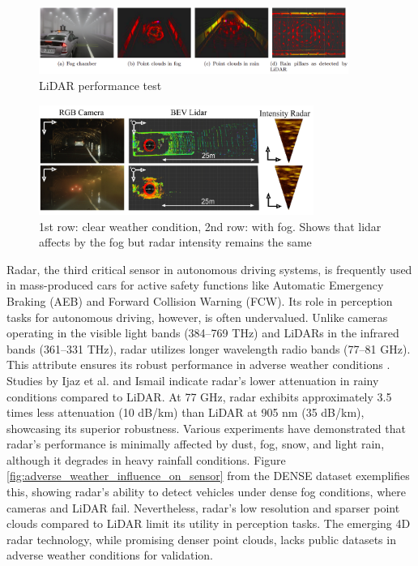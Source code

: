 \documentclass[report.tex]{subfiles}
\begin{document}
    \begin{figure}[h]
        \centering
        \includegraphics[width=0.9\textwidth]{images/lidar_issues.png}
        \caption{LiDAR performance test \cite{Zhang2021Dec}}
        \label{fig:lidar}
    \end{figure}

    \begin{figure}[h]
        \centering
        \includegraphics[width=0.8\textwidth]{images/lidar_in_fog.png}
        \caption{\centering 1st row: clear weather condition, 2nd row: with fog. Shows that lidar affects by the fog but radar intensity remains the same \cite{bijelic2020seeing}}
        \label{fig:lidar_in_fog}
    \end{figure}
    
    Radar, the third critical sensor in autonomous driving systems, is frequently used in mass-produced cars for active safety functions like Automatic Emergency Braking (AEB) and Forward Collision Warning (FCW). Its role in perception tasks for autonomous driving, however, is often undervalued. Unlike cameras operating in the visible light bands (384–769 THz) and LiDARs in the infrared bands (361–331 THz), radar utilizes longer wavelength radio bands (77–81 GHz). This attribute ensures its robust performance in adverse weather conditions \cite{Paek2022Jun}. Studies by Ijaz et al. \cite{ijaz2012analysis} and Ismail \cite{gultepe2008measurements} indicate radar's lower attenuation in rainy conditions compared to LiDAR. At 77 GHz, radar exhibits approximately 3.5 times less attenuation (10 dB/km) than LiDAR at 905 nm (35 dB/km), showcasing its superior robustness. Various experiments \cite{adams2012robotic, brooker2007seeing, xu2022learned, gourova2017analysis, zang2019impact} have demonstrated that radar's performance is minimally affected by dust, fog, snow, and light rain, although it degrades in heavy rainfall conditions. Figure \ref{fig:adverse_weather_influence_on_sensor} from the DENSE \cite{bijelic2020seeing} dataset exemplifies this, showing radar's ability to detect vehicles under dense fog conditions, where cameras and LiDAR fail. Nevertheless, radar's low resolution and sparser point clouds compared to LiDAR limit its utility in perception tasks. The emerging 4D radar technology, while promising denser point clouds, lacks public datasets in adverse weather conditions for validation.
\end{document}

